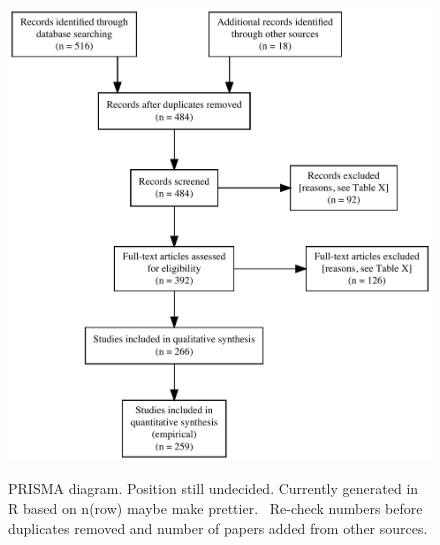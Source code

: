 \begin{figure}[h]
\centering
\caption{PRISMA diagram. Position still undecided. Currently generated in R based on n(row) maybe make prettier. \Warning\ Re-check numbers before duplicates removed and number of papers added from other sources.}
\includegraphics[width=\textwidth]{Figures/PRISMA}
\label{fig:PRISMA}
\end{figure}



